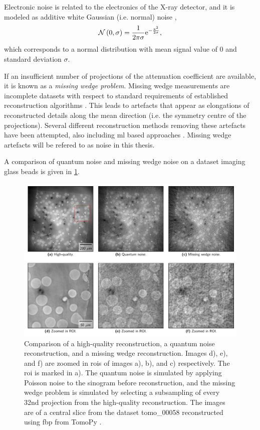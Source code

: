 Electronic noise is related to the electronics of the X-ray detector, and it is modeled as additive white Gaussian (i.e. normal) noise \cite{boas2012ct},
\begin{equation}
    \mathcal{N}\left(0,\sigma \right) = \frac{1}{2\pi\sigma}\rm{e}^{-\frac{x^2}{2\sigma}},
\end{equation}
which corresponds to a normal distribution with mean signal value of $0$ and standard deviation $\sigma$.

If an insufficient number of projections of the attenuation coefficient are available, it is known as a \textit{missing wedge problem}. Missing wedge measurements are incomplete datasets with respect to standard requirements of established reconstruction algorithms \cite{10.1111/jmi.12313}. This leads to artefacts that appear as elongations of reconstructed details along the mean direction (i.e. the symmetry centre of the projections). Several different reconstruction methods removing these artefacts have been attempted, also including \gls{ml} based approaches \cite{liu2020tomogan,GANrec}. Missing wedge artefacts will be refered to as noise in this thesis. 

A comparison of quantum noise and missing wedge noise on a dataset imaging glass beads is given in \cref{fig:noisecomparison}. 

\begin{figure}[htbp]  
    \centering
    \includegraphics[width=.9\textwidth]{figures/noisecomparison.pdf}
    \caption[Reconstruction noise comparison]{Comparison of a high-quality reconstruction, a quantum noise reconstruction, and a missing wedge reconstruction. Images d), e), and f) are zoomed in \gls{roi}s of images a), b), and c) respectively. The \gls{roi} is marked in a). The quantum noise is simulated by applying Poisson noise to the sinogram before reconstruction, and the missing wedge problem is simulated by selecting a subsampling of every 32nd projection from the high-quality reconstruction. The images are of a central slice from the dataset tomo\_00058 \cite{datasetglassspheres} reconstructed using \gls{fbp} from TomoPy \cite{TomoBank}. }
    \label{fig:noisecomparison}
\end{figure}

